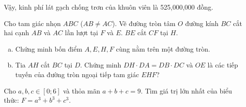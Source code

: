 \begin{ex}
{		Vậy, kinh phí lát gạch chống trơn của khuôn viên là 525,000,000 đồng.
	}
\end{ex}
\begin{ex} %
	Cho tam giác nhọn $ABC$ ($AB \ne AC$). Vẽ đường tròn tâm $O$ đường kính $BC$ cắt hai cạnh $AB$ và $AC$ lần lượt tại $F$ và $E$. $BE$ cắt $CF$ tại $H$.
	\begin{enumerate}[a)]
		\item Chứng minh bốn điểm $A, E, H, F$ cùng nằm trên một đường tròn.
		\item Tia $AH$ cắt $BC$ tại $D$. Chứng minh $DH \cdot DA = DB \cdot DC$ và $OE$ là các tiếp tuyến của đường tròn ngoại tiếp tam giác $EHF$?
	\end{enumerate}
	\loigiai{}
\end{ex}

\begin{ex} %
	Cho $a, b, c \in [0;6]$ và thỏa mãn $a+b+c=9$. Tìm giá trị lớn nhất của biểu thức:
	$F=a^3+b^3+c^3$.
	\loigiai{}
\end{ex}

